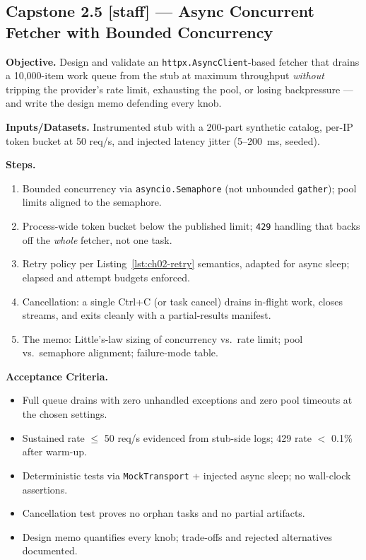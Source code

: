 \subsection{Capstone 2.5 [staff] --- Async Concurrent Fetcher with Bounded Concurrency}

\textbf{Objective.} Design and validate an \texttt{httpx.AsyncClient}-based
fetcher that drains a 10{,}000-item work queue from the stub at maximum
throughput \emph{without} tripping the provider's rate limit, exhausting the
pool, or losing backpressure --- and write the design memo defending every
knob.

\textbf{Inputs/Datasets.} Instrumented stub with a 200-part synthetic
catalog, per-IP token bucket at 50 req/s, and injected latency jitter
(5--200~ms, seeded).

\textbf{Steps.}
\begin{enumerate}
  \item Bounded concurrency via \texttt{asyncio.Semaphore} (not unbounded
        \texttt{gather}); pool limits aligned to the semaphore.
  \item Process-wide token bucket below the published limit; \texttt{429}
        handling that backs off the \emph{whole} fetcher, not one task.
  \item Retry policy per Listing~\ref{lst:ch02-retry} semantics, adapted for
        async sleep; elapsed and attempt budgets enforced.
  \item Cancellation: a single Ctrl+C (or task cancel) drains in-flight
        work, closes streams, and exits cleanly with a partial-results
        manifest.
  \item The memo: Little's-law sizing of concurrency vs.\ rate limit; pool
        vs.\ semaphore alignment; failure-mode table.
\end{enumerate}

\textbf{Acceptance Criteria.}
\begin{itemize}
  \item[$\square$] Full queue drains with zero unhandled exceptions and zero
        pool timeouts at the chosen settings.
  \item[$\square$] Sustained rate $\le$ 50 req/s evidenced from stub-side
        logs; 429 rate $<$ 0.1\% after warm-up.
  \item[$\square$] Deterministic tests via \texttt{MockTransport} + injected
        async sleep; no wall-clock assertions.
  \item[$\square$] Cancellation test proves no orphan tasks and no partial
        artifacts.
  \item[$\square$] Design memo quantifies every knob; trade-offs and
        rejected alternatives documented.
\end{itemize}

